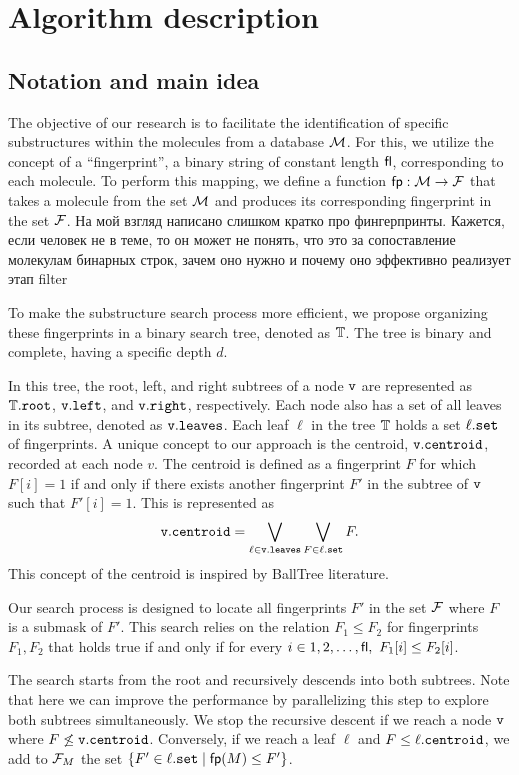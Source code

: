 \section{Algorithm description}

\subsection{Notation and main idea}
The objective of our research is to facilitate the identification of specific substructures within the molecules from a database $\mathcal{M}$. 
For this, we utilize the concept of a ``fingerprint'', a binary string of constant length ${\sf fl}$, corresponding to each molecule. 
To perform this mapping, we define a function ${\sf fp}: \mathcal{M} \to \mathcal{F}$ that takes a molecule from the set $\mathcal{M}$ and produces its 
corresponding fingerprint in the set $\mathcal{F}$. {\color{red} На мой взгляд написано слишком кратко про фингерпринты. Кажется, если 
человек не в теме, то он может не понять, что это за сопоставление молекулам бинарных строк, зачем оно нужно и почему оно эффективно реализует этап filter}

To make the substructure search process more efficient, we propose organizing these fingerprints in a binary search tree, denoted as $\mathbb{T}$. The tree is binary and complete, having a specific depth $d$.

In this tree, the root, left, and right subtrees of a node $\tt{v}$ are represented as $\mathbb{T}.\tt{root}$, $\tt{v.left}$, and $\tt{v.right}$, 
respectively. Each node also has a set of all leaves in its subtree, denoted as $\tt{v.leaves}$. Each leaf $\ell$ in the tree $\mathbb{T}$ holds 
a set $\ell.\tt{set}$ of fingerprints. A unique concept to our approach is the centroid, ${\tt v.centroid}$, recorded at each node $v$. 
The centroid is defined as a fingerprint $F$ for which $F[i] = 1$ if and only if there exists another fingerprint $F'$ in the subtree 
of $\tt{v}$ such that $F'[i] = 1$. This is represented as
$${\tt v.centroid} = \bigvee\limits_{\ell \in {\tt v.leaves}}\bigvee\limits_{F \in \ell.{\tt set}} F.$$ 
This concept of the centroid is inspired by BallTree literature.

Our search process is designed to locate all fingerprints $F'$ in the set $\mathcal{F}$ where $F$ is a submask of $F'$. This search relies on the relation $F_1 \le F_2$ for fingerprints $F_1, F_2$ that holds true if and only if for every $i \in {1, 2, \ldots, {\sf fl}}, \ F_1[i] \le F_2[i]$. 

The search starts from the root and recursively descends into both subtrees. Note that here we can improve the performance by parallelizing 
this step to explore both subtrees simultaneously. We stop the recursive descent if we reach a node ${\tt v}$ where $F \not\le {\tt v.centroid}$. 
Conversely, if we reach a leaf $\ell$ and $F \le \ell.{\tt centroid}$, we add to $\mathcal{F}_M$ the set $\{F' \in  \ell.{\tt set} \mid {\sf fp}(M) \le F'\}$.

